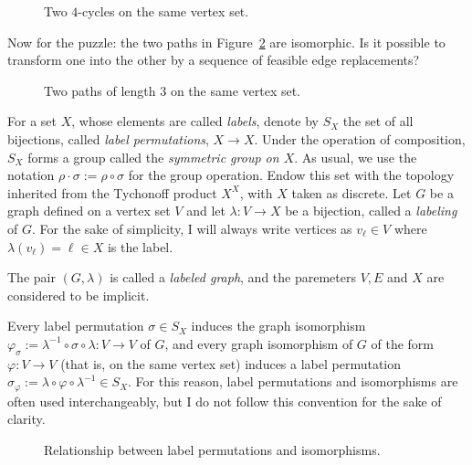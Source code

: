 \begin{figure}[htbp]
    \centering
    
    \caption{Two $4$-cycles on the same vertex set.}
    \label{fig:4_cycles}
\end{figure}

Now for the puzzle: the two paths in Figure~\ref{fig:4_paths} are isomorphic.
Is it possible to transform one into the other by a sequence of feasible edge replacements?

\begin{figure}[htbp]
    \centering
    
    \caption{Two paths of length $3$ on the same vertex set.}
    \label{fig:4_paths}
\end{figure}

\begin{definition}\label{def:labeled-graph}
    For a set $X$, whose elements are called \emph{labels}, denote by $S_X$ the set of all bijections, called \emph{label permutations}, $X\to X$.
    Under the operation of composition, $S_X$ forms a group called the \emph{symmetric group on $X$}.
    As usual, we use the notation $\rho\cdot\sigma:=\rho\circ\sigma$ for the group operation.
    Endow this set with the topology inherited from the Tychonoff product $X^X$, with $X$ taken as discrete.
    Let $G$ be a graph defined on a vertex set $V$ and let $\lambda\colon V\to X$ be a bijection, called a \emph{labeling} of $G$.
    For the sake of simplicity, I will always write vertices as $v_\ell\in V$ where $\lambda(v_\ell)=\ell\in X$ is the label.

    The pair $(G,\lambda)$ is called a \emph{labeled graph}, and the paremeters $V,E$ and $X$ are considered to be implicit.
\end{definition}

Every label permutation $\sigma\in S_X$ induces the graph isomorphism $\varphi_\sigma:=\lambda^{-1}\circ\sigma\circ\lambda\colon V\to V$ of $G$, and every graph isomorphism of $G$ of the form $\varphi\colon V\to V$ (that is, on the same vertex set) induces a label permutation $\sigma_\varphi:=\lambda\circ\varphi\circ\lambda^{-1}\in S_X$.
For this reason, label permutations and isomorphisms are often used interchangeably, but I do not follow this convention for the sake of clarity.

\begin{figure}[ht]
    \centering
    
    \caption{Relationship between label permutations and isomorphisms.}
    \label{fig:square-lambda-sigma-phi}
\end{figure}

